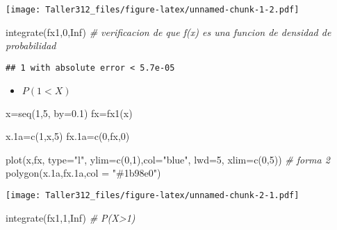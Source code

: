\documentclass[
]{article}
\newenvironment{Shaded}{\begin{snugshade}}{\end{snugshade}}
\newcommand{\AttributeTok}[1]{\textcolor[rgb]{0.77,0.63,0.00}{#1}}
\newcommand{\CommentTok}[1]{\textcolor[rgb]{0.56,0.35,0.01}{\textit{#1}}}
\newcommand{\ConstantTok}[1]{\textcolor[rgb]{0.00,0.00,0.00}{#1}}
\newcommand{\DecValTok}[1]{\textcolor[rgb]{0.00,0.00,0.81}{#1}}
\newcommand{\FloatTok}[1]{\textcolor[rgb]{0.00,0.00,0.81}{#1}}
\newcommand{\FunctionTok}[1]{\textcolor[rgb]{0.00,0.00,0.00}{#1}}
\newcommand{\NormalTok}[1]{#1}
\newcommand{\OtherTok}[1]{\textcolor[rgb]{0.56,0.35,0.01}{#1}}
\newcommand{\StringTok}[1]{\textcolor[rgb]{0.31,0.60,0.02}{#1}}
\providecommand{\tightlist}{%
  \setlength{\itemsep}{0pt}\setlength{\parskip}{0pt}}
\begin{document}
\texttt{[image: Taller312\_files/figure-latex/unnamed-chunk-1-2.pdf]}

\begin{Shaded}
\begin{Highlighting}[]
\FunctionTok{integrate}\NormalTok{(fx1,}\DecValTok{0}\NormalTok{,}\ConstantTok{Inf}\NormalTok{) }\CommentTok{\# verificacion de que f(x) es una funcion de densidad de probabilidad}
\end{Highlighting}
\end{Shaded}

\begin{verbatim}
## 1 with absolute error < 5.7e-05
\end{verbatim}

\begin{itemize}
\tightlist
\item
  \(P(1 < X)\)
\end{itemize}

\begin{Shaded}
\begin{Highlighting}[]
\NormalTok{x}\OtherTok{=}\FunctionTok{seq}\NormalTok{(}\DecValTok{1}\NormalTok{,}\DecValTok{5}\NormalTok{, }\AttributeTok{by=}\FloatTok{0.1}\NormalTok{)}
\NormalTok{fx}\OtherTok{=}\FunctionTok{fx1}\NormalTok{(x)}

\NormalTok{x}\FloatTok{.1}\NormalTok{a}\OtherTok{=}\FunctionTok{c}\NormalTok{(}\DecValTok{1}\NormalTok{,x,}\DecValTok{5}\NormalTok{)}
\NormalTok{fx}\FloatTok{.1}\NormalTok{a}\OtherTok{=}\FunctionTok{c}\NormalTok{(}\DecValTok{0}\NormalTok{,fx,}\DecValTok{0}\NormalTok{)}

\FunctionTok{plot}\NormalTok{(x,fx, }\AttributeTok{type=}\StringTok{"l"}\NormalTok{, }\AttributeTok{ylim=}\FunctionTok{c}\NormalTok{(}\DecValTok{0}\NormalTok{,}\DecValTok{1}\NormalTok{),}\AttributeTok{col=}\StringTok{"blue"}\NormalTok{, }\AttributeTok{lwd=}\DecValTok{5}\NormalTok{, }\AttributeTok{xlim=}\FunctionTok{c}\NormalTok{(}\DecValTok{0}\NormalTok{,}\DecValTok{5}\NormalTok{)) }\CommentTok{\# forma 2}
\FunctionTok{polygon}\NormalTok{(x}\FloatTok{.1}\NormalTok{a,fx}\FloatTok{.1}\NormalTok{a,}\AttributeTok{col =} \StringTok{"\#1b98e0"}\NormalTok{) }
\end{Highlighting}
\end{Shaded}

\texttt{[image: Taller312\_files/figure-latex/unnamed-chunk-2-1.pdf]}

\begin{Shaded}
\begin{Highlighting}[]
\FunctionTok{integrate}\NormalTok{(fx1,}\DecValTok{1}\NormalTok{,}\ConstantTok{Inf}\NormalTok{) }\CommentTok{\# P(X\textgreater{}1)}
\end{Highlighting}
\end{Shaded}
\end{document}
